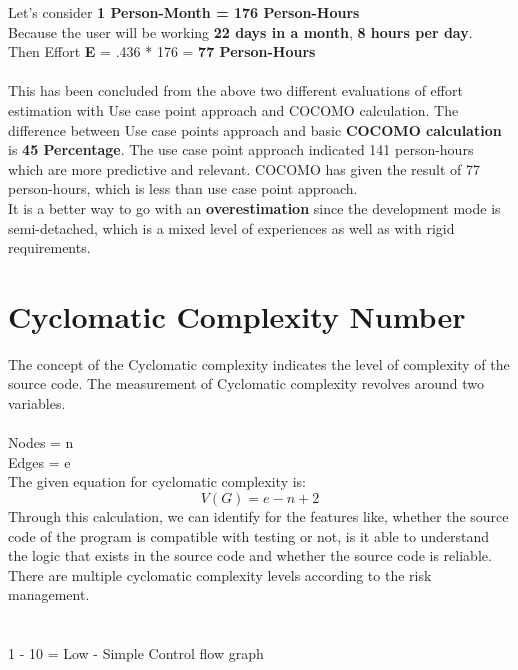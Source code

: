 \documentclass[a4paper, 11pt]{article}
\begin{document}
Let’s consider \textbf{1 Person-Month = 176 Person-Hours}\\

Because the user will be working \textbf{22 days in a month}, \textbf{8 hours per day}.\\

Then Effort\textbf{ E} = .436 * 176 = \textbf{77 Person-Hours}\\ \\
This has been concluded from the above two different evaluations of effort estimation with Use case point approach and COCOMO calculation. The difference between Use case points approach and basic \textbf{COCOMO calculation} is \textbf{45 Percentage}. The use case point approach indicated 141 person-hours which are more predictive and relevant. COCOMO has given the result of 77 person-hours, which is less than use case point approach.\\
It is a better way to go with an \textbf{overestimation} since the development mode is semi-detached, which is a mixed level of experiences as well as with rigid requirements.\\


\section{Cyclomatic Complexity Number}
The concept of the Cyclomatic complexity indicates the level of complexity of the source code. The measurement of Cyclomatic complexity revolves around two variables.\cite{6}\\ \\
Nodes = n\\
Edges = e \\
The given equation for cyclomatic complexity is:\\
\begin{equation}
V(G) = e - n + 2
\end{equation}
Through this calculation, we can identify for the features like, whether the source code of the program is compatible with testing or not, is it able to understand the logic that exists in the source code and whether the source code is reliable. There are multiple cyclomatic complexity levels according to the risk management.\\ \\ \\

  1 - 10  = Low - Simple Control flow graph  \\
\end{document}

